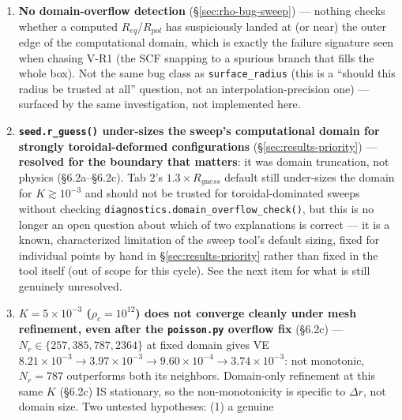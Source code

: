 \documentclass[11pt,a4paper]{scrartcl}
\newcommand{\code}[1]{\texttt{\small #1}}
\begin{document}
\begin{enumerate}[leftmargin=1.6em,itemsep=0.35em]
  V-R1) --- not resolved. The standard remedy (parametrize the
  near-terminal sequence by axis ratio instead of $\Omega_c$, solving
  $\Omega_c$ by an outer root-find --- the technique Hachisu's own method
  uses) was identified and spot-checked (a direct bisection on axis ratio
  saturates at the same point found by stepping $\Omega_c$, confirming
  $\Omega_c$ degenerates as a control parameter there) but not
  implemented as production code --- out of scope for now since
  differential rotation (the project's actual target) does not hit this
  problem in the tested range.
\item \textbf{No domain-overflow detection}
  (\S\ref{sec:rho-bug-sweep}) --- nothing checks whether a computed
  $R_{eq}$/$R_{pol}$ has suspiciously landed at (or near) the outer edge
  of the computational domain, which is exactly the failure signature
  seen when chasing V-R1 (the SCF snapping to a spurious branch that
  fills the whole box). Not the same bug class as \code{surface\_radius}
  (this is a ``should this radius be trusted at all'' question, not an
  interpolation-precision one) --- surfaced by the same investigation,
  not implemented here.
\item \textbf{\code{seed.r\_guess()} under-sizes the sweep's
  computational domain for strongly toroidal-deformed configurations}
  (\S\ref{sec:results-priority}) --- \textbf{resolved for the boundary
  that matters}: it was domain truncation, not physics
  (\S6.2a--\S6.2c). Tab 2's $1.3\times R_{guess}$ default still
  under-sizes the domain for $K\gtrsim10^{-3}$ and should not be
  trusted for toroidal-dominated sweeps without checking
  \code{diagnostics.domain\_overflow\_check()}, but this is no longer
  an open question about which of two explanations is correct --- it
  is a known, characterized limitation of the sweep tool's default
  sizing, fixed for individual points by hand in \S\ref{sec:results-priority}
  rather than fixed in the tool itself (out of scope for this cycle).
  See the next item for what is still genuinely unresolved.
\item \textbf{$K=5\times10^{-3}$ ($\rho_c=10^{12}$) does not converge
  cleanly under mesh refinement, even after the \code{poisson.py}
  overflow fix} (\S6.2c) --- $N_r\in\{257,385,787,2364\}$ at fixed
  domain gives VE $8.21\times10^{-3}\to3.97\times10^{-3}
  \to9.60\times10^{-4}\to3.74\times10^{-3}$: not monotonic, $N_r=787$
  outperforms both its neighbors. Domain-only refinement at this same
  $K$ (\S6.2c) IS stationary, so the non-monotonicity is specific to
  $\Delta r$, not domain size. Two untested hypotheses: (1) a genuine

\end{enumerate}
\end{document}
